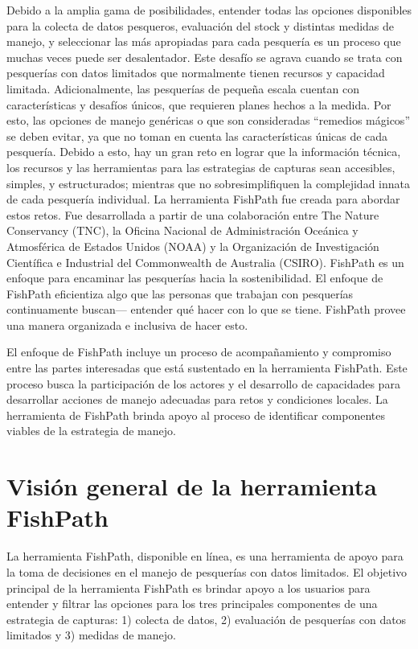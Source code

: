 \documentclass[
  11pt,
]{book}
\begin{document}
Debido a la amplia gama de posibilidades, entender todas las opciones disponibles para la colecta de datos pesqueros, evaluación del stock y distintas medidas de manejo, y seleccionar las más apropiadas para cada pesquería es un proceso que muchas veces puede ser desalentador. Este desafío se agrava cuando se trata con pesquerías con datos limitados que normalmente tienen recursos y capacidad limitada. Adicionalmente, las pesquerías de pequeña escala cuentan con características y desafíos únicos, que requieren planes hechos a la medida. Por esto, las opciones de manejo genéricas o que son consideradas ``remedios mágicos'' se deben evitar, ya que no toman en cuenta las características únicas de cada pesquería. Debido a esto, hay un gran reto en lograr que la información técnica, los recursos y las herramientas para las estrategias de capturas sean accesibles, simples, y estructurados; mientras que no sobresimplifiquen la complejidad innata de cada pesquería individual.
La herramienta FishPath fue creada para abordar estos retos. Fue desarrollada a partir de una colaboración entre The Nature Conservancy (TNC), la Oficina Nacional de Administración Oceánica y Atmosférica de Estados Unidos (NOAA) y la Organización de Investigación Científica e Industrial del Commonwealth de Australia (CSIRO). FishPath es un enfoque para encaminar las pesquerías hacia la sostenibilidad. El enfoque de FishPath eficientiza algo que las personas que trabajan con pesquerías continuamente buscan--- entender qué hacer con lo que se tiene. FishPath provee una manera organizada e inclusiva de hacer esto.

El enfoque de FishPath incluye un proceso de acompañamiento y compromiso entre las partes interesadas que está sustentado en la herramienta FishPath. Este proceso busca la participación de los actores y el desarrollo de capacidades para desarrollar acciones de manejo adecuadas para retos y condiciones locales. La herramienta de FishPath brinda apoyo al proceso de identificar componentes viables de la estrategia de manejo.

\hypertarget{visiuxf3n-general-de-la-herramienta-fishpath}{%
\section{Visión general de la herramienta FishPath}\label{visiuxf3n-general-de-la-herramienta-fishpath}}

La herramienta FishPath, disponible en línea, es una herramienta de apoyo para la toma de decisiones en el manejo de pesquerías con datos limitados. El objetivo principal de la herramienta FishPath es brindar apoyo a los usuarios para entender y filtrar las opciones para los tres principales componentes de una estrategia de capturas: 1) colecta de datos, 2) evaluación de pesquerías con datos limitados y 3) medidas de manejo.
\end{document}
